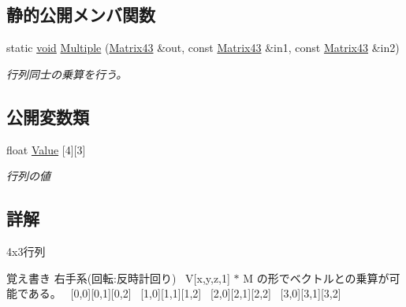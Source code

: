 \subsection*{静的公開メンバ関数}
\begin{DoxyCompactItemize}
\item 
static \mbox{\hyperlink{namespace_effekseer_ab34c4088e512200cf4c2716f168deb56}{void}} \mbox{\hyperlink{struct_effekseer_1_1_matrix43_accff4bf845b1bfec3f6d8fb7e3e60516}{Multiple}} (\mbox{\hyperlink{struct_effekseer_1_1_matrix43}{Matrix43}} \&out, const \mbox{\hyperlink{struct_effekseer_1_1_matrix43}{Matrix43}} \&in1, const \mbox{\hyperlink{struct_effekseer_1_1_matrix43}{Matrix43}} \&in2)
\begin{DoxyCompactList}\small\item\em 行列同士の乗算を行う。 \end{DoxyCompactList}\end{DoxyCompactItemize}
\subsection*{公開変数類}
\begin{DoxyCompactItemize}
\item 
float \mbox{\hyperlink{struct_effekseer_1_1_matrix43_ae2c06e2b30bcc9cc28d11bd72674bbd2}{Value}} \mbox{[}4\mbox{]}\mbox{[}3\mbox{]}
\begin{DoxyCompactList}\small\item\em 行列の値 \end{DoxyCompactList}\end{DoxyCompactItemize}


\subsection{詳解}
4x3行列 

\begin{DoxyNote}{覚え書き}
右手系(回転\+:反時計回り)~\newline
 V\mbox{[}x,y,z,1\mbox{]} $\ast$ M の形でベクトルとの乗算が可能である。~\newline
 \mbox{[}0,0\mbox{]}\mbox{[}0,1\mbox{]}\mbox{[}0,2\mbox{]}~\newline
 \mbox{[}1,0\mbox{]}\mbox{[}1,1\mbox{]}\mbox{[}1,2\mbox{]}~\newline
 \mbox{[}2,0\mbox{]}\mbox{[}2,1\mbox{]}\mbox{[}2,2\mbox{]}~\newline
 \mbox{[}3,0\mbox{]}\mbox{[}3,1\mbox{]}\mbox{[}3,2\mbox{]}~\newline
 
\end{DoxyNote}


